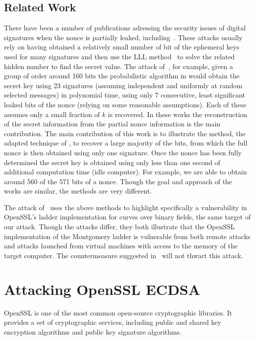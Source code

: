 \documentclass{llncs}
\begin{document}
\subsection{Related Work}\label{sec:related}
There have been a number of publications adressing the security issues of digital signatures when the nonce is partially leaked, including~\cite{Howgrave-GrahamS01,gopalakrishnan07solving,nguyen03insecurity}. These attacks usually rely on having obtained a relatively small number of bit of the ephemeral keys used for many signatures and then use the LLL method~\cite{LLL} to solve the related hidden number to find the secret value. The attack of~\cite{nguyen03insecurity}, for example, given a group of order around 160 bits the probabilistic algorithm in would obtain the secret key using 23 signatures (assuming independent and uniformly at random selected messages) in polynomial time, using only 7 consecutive, least significant leaked bits of the nonce (relying on some reasonable assumptions). Each of these assumes only a small fraction of $k$ is recovered. In these works the reconstruction of the secret information from the partial nonce information is the main contribution. The main contribution of this work is to illustrate the method, the adapted technique of \cite{yarom13flush}, to recover a large majority of the bits, from which the full nonce is then obtained using only one signature. Once the nonce has been fully determined the secret key is obtained using only less than one second of additional computation time (idle computer). 
For example, we are able to obtain around 560 of the 571 bits of a nonce. Though the goal and approach of the works are similar, the methods are very different.

The attack of~\cite{brumley11remote} uses the above methods to highlight specifically a vulnerability in OpenSSL's ladder implementation for curves over binary fields, the same target of our attack. Though the attacks differ, they both illustrate that the OpenSSL implementation of the Montgomery ladder is vulnerable from both remote attacks and attacks launched from virtual machines with access to the memory of the target computer. The countermeasure suggested in~\cite{brumley11remote} will not thwart this attack.

\section{Attacking OpenSSL ECDSA}\label{sec:attack}
OpenSSL is one of the most common open-source cryptographic libraries.
It provides a set of cryptographic services, including public and shared key encryption 
algorithms and public key signature algorithms.
\end{document}
